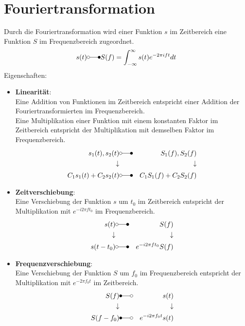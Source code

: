 \documentclass[12pt]{article}
\begin{document}
\section{Fouriertransformation}
Durch die Fouriertransformation wird einer Funktion $s$ im Zeitbereich eine Funktion $S$ im Frequenzbereich zugeordnet.
\begin{equation*}
	s(t)\laplace S(f)=\int_{-\infty}^\infty s(t)e^{-2\pi ift}dt
\end{equation*}
Eigenschaften:
\begin{itemize}
	\item \textbf{Linearität}:\\
			Eine Addition von Funktionen im Zeitbereich entspricht einer Addition der Fouriertransformierten im Frequenzbereich.\\
			Eine Multiplikation einer Funktion mit einem konstanten Faktor im Zeitbereich entspricht der Multiplikation mit demselben Faktor im Frequenzbereich.
			\begin{eqnarray*}
				s_1(t),s_2(t) & \laplace & S_1(f),S_2(f)\\
				\downarrow & & \downarrow \\
				C_1s_1(t)+C_2s_2(t) & \laplace & C_1S_1(f)+C_2S_2(f)
			\end{eqnarray*}
	\item \textbf{Zeitverschiebung}:\\
			Eine Verschiebung der Funktion $s$ um $t_0$ im Zeitbereich entspricht der Multiplikation mit $e^{-i2\pi ft_0}$ im Frequenzbereich.
			\begin{eqnarray*}
				s(t) & \laplace & S(f)\\
				\downarrow & & \downarrow \\
				s(t-t_0) & \laplace & e^{-i2\pi ft_0}S(f)
			\end{eqnarray*}
	\item \textbf{Frequenzverschiebung}:\\
			Eine Verschiebung der Funktion $S$ um $f_0$ im Frequenzbereich entspricht der Multiplikation mit $e^{-2\pi f_0 t}$ im Zeitbereich.
			\begin{eqnarray*}
				S(f) & \Laplace & s(t)\\
				\downarrow & & \downarrow \\
				S(f-f_0) & \Laplace & e^{-i2\pi f_0t}s(t)
			\end{eqnarray*}
\end{itemize}
\newpage
\end{document}
